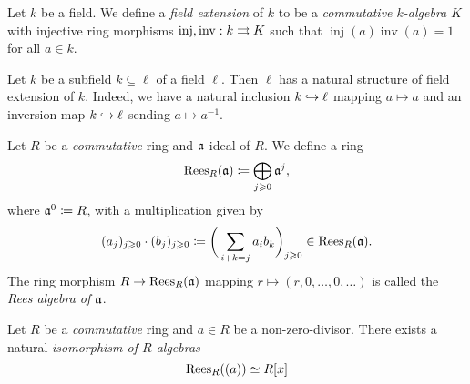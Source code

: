 \begin{definition}
    \label{def:field-extension}
    Let \(k\) be a field. We define a \emph{field extension} of \(k\) to be a
    \emph{commutative \(k\)-algebra} \(K\) with injective ring morphisms
    \(\operatorname{inj}, \operatorname{inv}: k \rightrightarrows K\) such that
    \(\operatorname{inj}(a) \operatorname{inv}(a) = 1\) for all \(a \in k\).
\end{definition}

\begin{example}
    \label{exp:subfield-natural-field-extension}
    Let \(k\) be a subfield \(k \subseteq \ell\) of a field \(\ell\). Then \(\ell\)
    has a natural structure of field extension of \(k\). Indeed, we have a natural
    inclusion \(k \hookrightarrow \ell\) mapping \(a \mapsto a\) and an inversion map
    \(k \hookrightarrow \ell\) sending \(a \mapsto a^{-1}\).
\end{example}

\begin{definition}
    \label{def:rees-algebra}
    Let \(R\) be a \emph{commutative} ring and \(\mathfrak{a}\) ideal of \(R\). We
    define a ring
    \[
        \operatorname{Rees}_R(\mathfrak{a}) \coloneq \bigoplus_{j \geqslant 0} \mathfrak{a}^j,
    \]
    where \(\mathfrak{a}^0 \coloneq R\), with a multiplication given by
    \[
        (a_j)_{j \geqslant 0} \cdot (b_j)_{j \geqslant 0} \coloneq
        \bigg( \sum_{i + k = j} a_i b_k \bigg)_{j \geqslant 0}
        \in \operatorname{Rees}_R(\mathfrak{a}).
    \]
    The ring morphism \(R \to \operatorname{Rees}_R(\mathfrak{a})\) mapping
    \(r \mapsto (r, 0, \dots, 0, \dots)\) is called the \emph{Rees algebra of
        \(\mathfrak{a}\)}.
\end{definition}

\begin{proposition}
    \label{prop:rees-algebra-iso-R[x]}
    Let \(R\) be a \emph{commutative} ring and \(a \in R\) be a
    non-zero-divisor. There exists a natural \emph{isomorphism of \(R\)-algebras}
    \[
        \operatorname{Rees}_R((a)) \simeq R[x]
    \]
\end{proposition}

